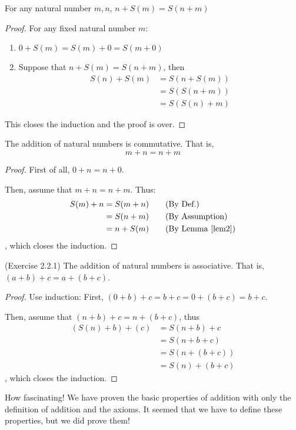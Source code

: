 \begin{lem}
For any natural number $m,n$, $n+S(m)=S(n+m)$ \label{lem2}
\end{lem}
\begin{proof}
For any fixed natural number $m$:
\begin{enumerate}
\item $0+S(m)=S(m)+0=S(m+0)$
\item Suppose that $n+S(m)=S(n+m)$, then 
\begin{align*}
S(n) + S(m) 
&= S(n+S(m)) \tag{By Def.} \\
&= S(S(n+m)) \tag{By assumption} \\
&= S(S(n)+m) \tag{By Def.}
\end{align*}
\end{enumerate} 
This closes the induction and the proof is over. \qedhere
\end{proof}

\begin{prop}
The addition of natural numbers is commutative. That is,
\[
m + n = n + m
\]
\end{prop}
\begin{proof}
First of all, $0+n=n+0$.

Then, assume that $m+n=n+m$. Thus:
\begin{align*}
S(m)+n
&= S(m+n) \tag{By Def.}\\
&= S(n+m) \tag{By Assumption}\\
&= n+S(m) \tag{By Lemma \ref{lem2}}
\end{align*}, which closes the induction. \qedhere
\end{proof}

\begin{prop}
(Exercise 2.2.1) \label{exercise2.2.1}
The addition of natural numbers is associative. That is, $(a+b)+c=a+(b+c)$.
\end{prop}
\begin{proof}
Use induction: First, $(0+b)+c=b+c=0+(b+c)=b+c$.

Then, assume that $(n+b)+c=n+(b+c)$, thus 
\begin{align*}
(S(n)+b)+(c)
&= S(n+b)+c\\
&= S(n+b+c)\\
&= S(n+(b+c)) \tag{By assumption}\\
&= S(n)+(b+c)
\end{align*}
, which closes the induction. \qedhere
\end{proof}

How fascinating! We have proven the basic properties of addition with only the definition of addition 
and the axioms. It seemed that we have to define these properties, but we did prove them!

